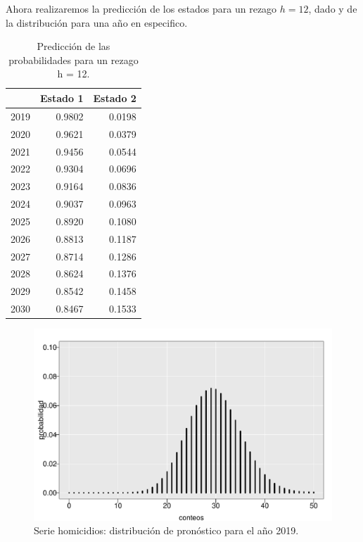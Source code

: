 \documentclass[a4paper]{article}\usepackage[]{graphicx}\usepackage[]{color}
\makeatletter
\def\maxwidth{ %
  \ifdim\Gin@nat@width>\linewidth
    \linewidth
  \else
    \Gin@nat@width
  \fi
}
\newenvironment{knitrout}{}{} %
\makeatother
\begin{document}
Ahora realizaremos la predicción de los estados para un rezago $h = 12$, dado y de la distribución para una año en especifico.

\begin{table}[ht]
\centering
\begin{tabular}{rrr}
  \hline
 & Estado 1 & Estado 2 \\ 
  \hline
2019 & 0.9802 & 0.0198 \\ 
  2020 & 0.9621 & 0.0379 \\ 
  2021 & 0.9456 & 0.0544 \\ 
  2022 & 0.9304 & 0.0696 \\ 
  2023 & 0.9164 & 0.0836 \\ 
  2024 & 0.9037 & 0.0963 \\ 
  2025 & 0.8920 & 0.1080 \\ 
  2026 & 0.8813 & 0.1187 \\ 
  2027 & 0.8714 & 0.1286 \\ 
  2028 & 0.8624 & 0.1376 \\ 
  2029 & 0.8542 & 0.1458 \\ 
  2030 & 0.8467 & 0.1533 \\ 
   \hline
\end{tabular}
\caption{Predicción de las probabilidades para un rezago h = 12.} 
\end{table}



\begin{knitrout}
\color{fgcolor}\begin{figure}
\includegraphics[width=\maxwidth]{figure/unnamed-chunk-20-1} \caption[Serie homicidios]{Serie homicidios: distribución de pronóstico para el año 2019.}\label{fig:unnamed-chunk-20}
\end{figure}


\end{knitrout}
\end{document}
